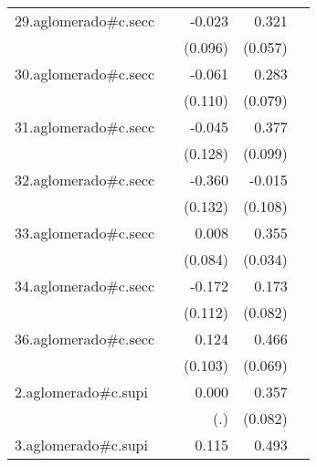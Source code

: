 {\begin{longtable}{l*{4}{D{.}{.}{-1}}}
\addlinespace
29.aglomerado#c.secc&                     &      -0.023         &       0.321\sym{***}&                     \\
            &                     &     (0.096)         &     (0.057)         &                     \\
\addlinespace
30.aglomerado#c.secc&                     &      -0.061         &       0.283\sym{***}&                     \\
            &                     &     (0.110)         &     (0.079)         &                     \\
\addlinespace
31.aglomerado#c.secc&                     &      -0.045         &       0.377\sym{***}&                     \\
            &                     &     (0.128)         &     (0.099)         &                     \\
\addlinespace
32.aglomerado#c.secc&                     &      -0.360\sym{**} &      -0.015         &                     \\
            &                     &     (0.132)         &     (0.108)         &                     \\
\addlinespace
33.aglomerado#c.secc&                     &       0.008         &       0.355\sym{***}&                     \\
            &                     &     (0.084)         &     (0.034)         &                     \\
\addlinespace
34.aglomerado#c.secc&                     &      -0.172         &       0.173\sym{*}  &                     \\
            &                     &     (0.112)         &     (0.082)         &                     \\
\addlinespace
36.aglomerado#c.secc&                     &       0.124         &       0.466\sym{***}&                     \\
            &                     &     (0.103)         &     (0.069)         &                     \\
\addlinespace
2.aglomerado#c.supi&                     &       0.000         &       0.357\sym{***}&                     \\
            &                     &         (.)         &     (0.082)         &                     \\
\addlinespace
3.aglomerado#c.supi&                     &       0.115         &       0.493\sym{***}&                     \\

\end{longtable}}

